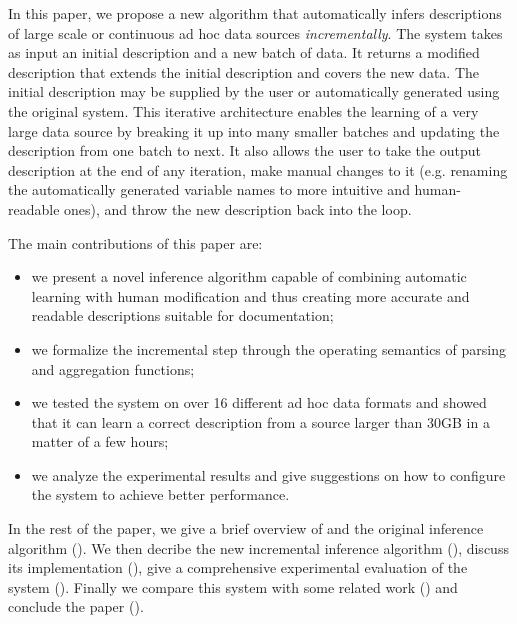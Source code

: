 In this paper, we propose a new algorithm that automatically infers 
descriptions of large scale or continuous ad hoc data sources 
{\em incrementally}. The system takes as input an initial description 
and a new batch of data. It returns a
modified description that extends the initial description and covers the new 
data. The initial description may be supplied by the user or automatically
generated using the original \learnpads{} system. This iterative architecture
enables the learning of a very large data source by breaking it up 
into many smaller batches and updating the description from one batch to next. 
It also allows the user to take the output description at the end of
any iteration, make manual changes to it (e.g. renaming the 
automatically generated variable names to more intuitive and human-readable
ones), and throw the new description back into the loop.

The main contributions of this paper are:
\begin{itemize}
\item we present a novel inference algorithm capable of
combining automatic learning with human modification and thus creating 
more accurate and readable descriptions suitable for documentation;
\item we formalize the incremental step through the operating semantics of 
parsing and aggregation functions;
\item we tested the system on over 16 different ad hoc data formats and
showed that it can learn a correct description from a source larger than
30GB in a matter of a few hours;
\item we analyze the experimental results and give suggestions on how to 
configure the system to achieve better performance.
\end{itemize}

In the rest of the paper, we give a brief overview of \pads{} and the original
\learnpads{} inference algorithm (). We then decribe
the new incremental inference algorithm (), discuss its
implementation (), give a comprehensive experimental
evaluation of the system (). Finally we compare this
system with some related work () and conclude
the paper ().
